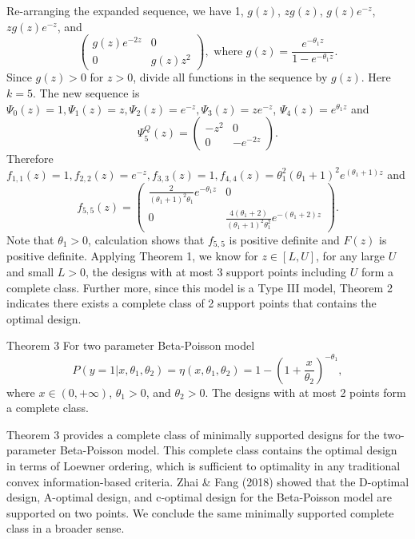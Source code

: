 \documentclass[12pt]{TD-CJS}
\begin{document}
Re-arranging the expanded sequence, we have 1, $g(z)$, $zg(z)$, $g(z)e^{-z}$, $zg(z)e^{-z}$, and \[\left( \begin{array}{cc}
 g(z)e^{-2z} & 0\\
0 &g(z)z^2 
\end{array} \right), \text{ where }g(z) = \frac{e^{-\theta_1z}}{1-e^{-\theta_1z}}. \] Since $g(z)>0$ for $z>0$, divide all functions in the sequence by $g(z)$. Here $k=5$. The new sequence is $\Psi_0(z) =1, \Psi_1(z) = z, \Psi_2(z) = e^{-z}, \Psi_3(z) =ze^{-z}$, $\Psi_4(z) =e^{\theta_1z}$ and  \[\Psi_5^Q(z)= \left( \begin{array}{cc}
-z^2& 0\\
0 &-e^{-2z}
\end{array} \right).\]  Therefore $f_{1,1}(z) = 1,f_{2,2}(z) = e^{-z},f_{3,3}(z) = 1,f_{4,4}(z) = \theta_1^2(\theta_1+1)^2e^{(\theta_1+1)z}$ and  \[f_{5,5}(z)= \left( \begin{array}{cc}
\frac{2}{(\theta_1+1)^2\theta_1}e^{-\theta_1z}& 0\\
0 & \frac{4(\theta_1+2)}{(\theta_1+1)^2\theta_1^2}e^{-(\theta_1+2)z}
\end{array} \right).\] Note that $\theta_1>0$, calculation shows that $f_{5,5}$ is positive definite and $F(z)$ is positive definite. Applying Theorem 1, we know for $z\in[L,U]$, for any large $U$ and small $L>0$, the designs with at most 3 support points including $U$ form a complete class. Further more, since this model is a Type III model, Theorem 2 indicates there exists a complete class of 2 support points that contains the optimal design. 



\begin{theorem}{Theorem 3}{}\label{beta}
For two parameter Beta-Poisson model \[
P(y=1|x,\theta_1,\theta_2) = \eta(x,\theta_1,\theta_2)= 1-(1+\frac{x}{\theta_2})^{-\theta_1},
\] where $x\in (0,+\infty)$, $\theta_1>0$, and $\theta_2>0$.  The designs with at most 2 points form a complete class.
\end{theorem}

Theorem 3 provides a complete class of minimally supported designs for the two-parameter Beta-Poisson model. This complete class contains the optimal design in terms of Loewner ordering, which is sufficient to optimality in any traditional convex information-based criteria. Zhai \& Fang (2018) showed that the D-optimal design, A-optimal design, and c-optimal design for the Beta-Poisson model are supported on two points. We conclude the same minimally supported complete class in a broader sense.
\end{document}
